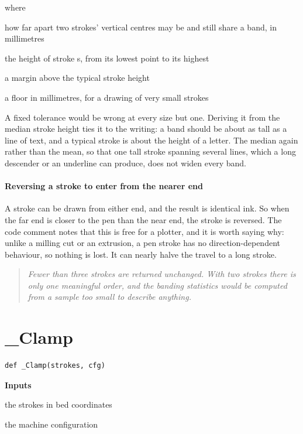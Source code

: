 \noindent where
\begin{description}[leftmargin=2.4em,style=nextline,font=\normalfont\ttfamily]\setlength\itemsep{1pt}
  \item[{$\mathrm{rowTol}$}] \normalfont how far apart two strokes' vertical centres may be and still share a band, in millimetres
  \item[{$h_s$}] \normalfont the height of stroke s, from its lowest point to its highest
  \item[{$1.2$}] \normalfont a margin above the typical stroke height
  \item[{$1$}] \normalfont a floor in millimetres, for a drawing of very small strokes
\end{description}
A fixed tolerance would be wrong at every size but one. Deriving it from the median stroke height ties it to the writing: a band should be about as tall as a line of text, and a typical stroke is about the height of a letter. The median again rather than the mean, so that one tall stroke spanning several lines, which a long descender or an underline can produce, does not widen every band.


\paragraph{Reversing a stroke to enter from the nearer end}
A stroke can be drawn from either end, and the result is identical ink. So when the far end is closer to the pen than the near end, the stroke is reversed. The code comment notes that this is free for a plotter, and it is worth saying why: unlike a milling cut or an extrusion, a pen stroke has no direction-dependent behaviour, so nothing is lost. It can nearly halve the travel to a long stroke.


\begin{quote}\small\itshape Fewer than three strokes are returned unchanged. With two strokes there is only one meaningful order, and the banding statistics would be computed from a sample too small to describe anything.\end{quote}

\section{\_Clamp}
\begin{lstlisting}[style=sig]
def _Clamp(strokes, cfg)
\end{lstlisting}

\noindent\textbf{Inputs}
\begin{description}[leftmargin=2.2em,style=nextline,font=\normalfont\ttfamily]\setlength\itemsep{1pt}
  \item[{strokes}] \normalfont the strokes in bed coordinates
  \item[{cfg}] \normalfont the machine configuration
\end{description}

